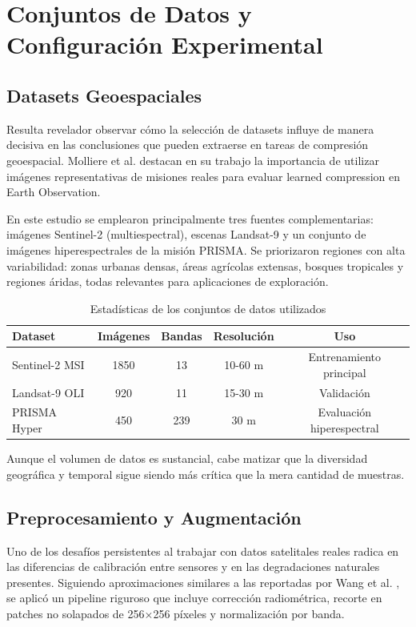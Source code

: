 \section{Conjuntos de Datos y Configuración Experimental}

\subsection{Datasets Geoespaciales}

Resulta revelador observar cómo la selección de datasets influye de manera decisiva en las conclusiones que pueden extraerse en tareas de compresión geoespacial. Molliere et al. \cite{Molliere2025_Learned_EO_Compression} destacan en su trabajo la importancia de utilizar imágenes representativas de misiones reales para evaluar learned compression en Earth Observation.

En este estudio se emplearon principalmente tres fuentes complementarias: imágenes Sentinel-2 (multiespectral), escenas Landsat-9 y un conjunto de imágenes hiperespectrales de la misión PRISMA. Se priorizaron regiones con alta variabilidad: zonas urbanas densas, áreas agrícolas extensas, bosques tropicales y regiones áridas, todas relevantes para aplicaciones de exploración.

\begin{table}[h]
\centering
\caption{Estadísticas de los conjuntos de datos utilizados}
\label{tab:estadisticas_datasets}
\begin{tabular}{lcccc}
\hline
\textbf{Dataset} & \textbf{Imágenes} & \textbf{Bandas} & \textbf{Resolución} & \textbf{Uso} \\
\hline
Sentinel-2 MSI & 1850 & 13 & 10-60 m & Entrenamiento principal \\
Landsat-9 OLI & 920 & 11 & 15-30 m & Validación \\
PRISMA Hyper & 450 & 239 & 30 m & Evaluación hiperespectral \\
\hline
\end{tabular}
\end{table}

Aunque el volumen de datos es sustancial, cabe matizar que la diversidad geográfica y temporal sigue siendo más crítica que la mera cantidad de muestras.

\subsection{Preprocesamiento y Augmentación}

Uno de los desafíos persistentes al trabajar con datos satelitales reales radica en las diferencias de calibración entre sensores y en las degradaciones naturales presentes. Siguiendo aproximaciones similares a las reportadas por Wang et al. \cite{Wang2025_RS_Compression}, se aplicó un pipeline riguroso que incluye corrección radiométrica, recorte en patches no solapados de 256×256 píxeles y normalización por banda.

